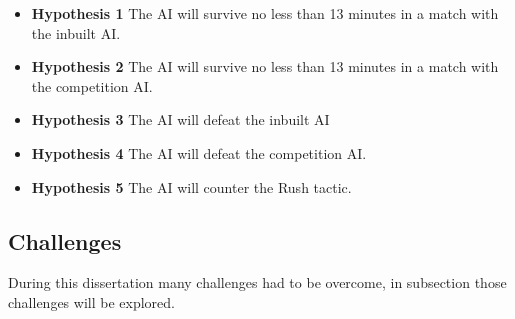 \documentclass[journal]{IEEEtran}
\begin{document}
\begin{itemize}
\item \textbf{Hypothesis 1} The AI will survive no less than 13 minutes in a match with the inbuilt AI.
\item \textbf{Hypothesis 2} The AI will survive no less than 13 minutes in a match with the competition AI.
\item \textbf{Hypothesis 3} The AI will defeat the inbuilt AI
\item \textbf{Hypothesis 4} The AI will defeat the competition AI.
\item \textbf{Hypothesis 5} The AI will counter the Rush tactic.
\end{itemize}

\subsection{Challenges}
During this dissertation many challenges had to be overcome, in subsection those challenges will be explored.




\appendix
\end{document}
